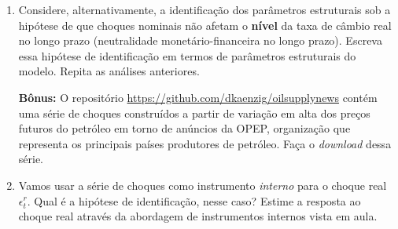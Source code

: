 \documentclass[10pt,a4paper]{article}
\begin{document}
\begin{enumerate}
\item  Considere, alternativamente, a identificação dos parâmetros estruturais sob a hipótese de que choques nominais não afetam o \textbf{nível} da taxa de câmbio real no longo prazo (neutralidade monetário-financeira no longo prazo). Escreva essa hipótese de identificação em termos de parâmetros estruturais do modelo. Repita as análises anteriores.

\vspace{2em}
\textbf{Bônus:} O repositório \url{https://github.com/dkaenzig/oilsupplynews} contém uma série de choques construídos a partir de variação em alta dos preços futuros do petróleo em torno de anúncios da OPEP, organização que representa os principais países produtores de petróleo. Faça o \textit{download} dessa série.

\item Vamos usar a série de choques como instrumento \textit{interno} para o choque real $\epsilon^r_t$. Qual é a hipótese de identificação, nesse caso? Estime a resposta ao choque real através da abordagem de instrumentos internos vista em aula.

\end{enumerate}
\end{document}
